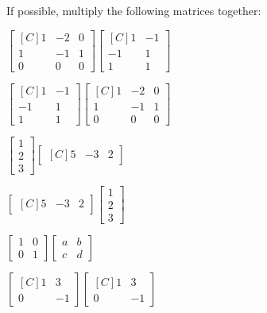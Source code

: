 \begin{exercise} If possible, multiply the following matrices together:\\
\begin{inparaenum}[a)]
\item $\begin{bmatrix*}[C] 1 & -2 & 0 \\ 1 & -1 & 1 \\ 0 & 0 & 0 \end{bmatrix*}\begin{bmatrix*}[C] 1 & -1 \\ -1 & 1 \\ 1 & 1 \end{bmatrix*}$ \hfill
\item $\begin{bmatrix*}[C] 1 & -1 \\ -1 & 1 \\ 1 & 1 \end{bmatrix*}\begin{bmatrix*}[C] 1 & -2 & 0 \\ 1 & -1 & 1 \\ 0 & 0 & 0 \end{bmatrix*}$\hfill {} \\
\item $\begin{bmatrix} 1 \\ 2 \\ 3 \end{bmatrix} \begin{bmatrix*}[C]5 & -3 & 2\end{bmatrix*}$ \hfill 
\item $\begin{bmatrix*}[C]5 & -3 & 2\end{bmatrix*}\begin{bmatrix} 1 \\ 2 \\ 3 \end{bmatrix}$\hfill {} \\
\item $\begin{bmatrix}1 & 0\\0 & 1 \end{bmatrix}\begin{bmatrix}a & b \\ c & d \end{bmatrix}$ \hfill
\item $\begin{bmatrix*}[C]1 & 3\\0 & -1 \end{bmatrix*}\begin{bmatrix*}[C]1 & 3 \\ 0 & -1 \end{bmatrix*}$ \hfill {} \\
\end{inparaenum}
\end{exercise}
